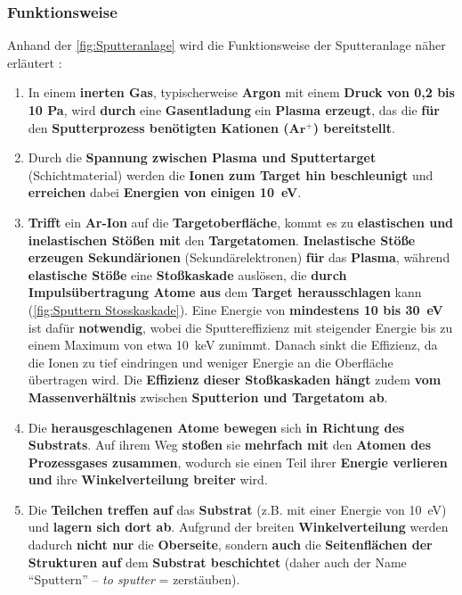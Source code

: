 \documentclass{article} %
\begin{document}
\vspace{1em}
\subsubsection{Funktionsweise} %
Anhand der \autoref{fig:Sputteranlage} wird die Funktionsweise der Sputteranlage näher erläutert \cite{keplinger2024}:

\begin{enumerate}
    \item In einem \textbf{inerten Gas}, typischerweise \textbf{Argon} mit einem \textbf{Druck von 0,2 bis 10 Pa}, wird \textbf{durch} eine 
    \textbf{Gasentladung} ein \textbf{Plasma erzeugt}, das die \textbf{für} den \textbf{Sputterprozess benötigten Kationen ($\mathbf{Ar^+}$) 
    bereitstellt}.
    \item Durch die \textbf{Spannung zwischen Plasma und Sputtertarget} (Schichtmaterial) werden die \textbf{Ionen zum Target hin beschleunigt} 
    und \textbf{erreichen} dabei \textbf{Energien von einigen 10~eV}.
    \item \textbf{Trifft} ein \textbf{Ar-Ion} auf die \textbf{Targetoberfläche}, kommt es zu \textbf{elastischen und inelastischen Stößen mit} 
    den \textbf{Targetatomen}. \textbf{Inelastische Stöße erzeugen Sekundärionen} (Sekundärelektronen) \textbf{für} das \textbf{Plasma}, während 
    \textbf{elastische Stöße} eine \textbf{Stoßkaskade} auslösen, die \textbf{durch Impulsübertragung Atome aus} dem \textbf{Target 
    herausschlagen} kann (\autoref{fig:Sputtern Stosskaskade}). Eine Energie von \textbf{mindestens 10 bis 30~eV} ist dafür \textbf{notwendig}, 
    wobei die Sputtereffizienz mit steigender Energie bis zu einem Maximum von etwa 10~keV zunimmt. Danach sinkt die Effizienz, da die Ionen zu 
    tief eindringen und weniger Energie an die Oberfläche übertragen wird. Die \textbf{Effizienz dieser Stoßkaskaden hängt} zudem 
    \textbf{vom Massenverhältnis} zwischen \textbf{Sputterion und Targetatom ab}.
    \item Die \textbf{herausgeschlagenen Atome bewegen} sich \textbf{in Richtung des Substrats}. Auf ihrem Weg \textbf{stoßen} sie 
    \textbf{mehrfach mit} den \textbf{Atomen des Prozessgases zusammen}, wodurch sie einen Teil ihrer \textbf{Energie verlieren und} ihre 
    \textbf{Winkelverteilung breiter} wird.
    \item Die \textbf{Teilchen treffen auf} das \textbf{Substrat} (z.B. mit einer Energie von 10~eV) und \textbf{lagern sich dort ab}. 
    Aufgrund der breiten \textbf{Winkelverteilung} werden dadurch \textbf{nicht nur} die \textbf{Oberseite}, sondern \textbf{auch} die 
    \textbf{Seitenflächen der Strukturen auf} dem \textbf{Substrat beschichtet} (daher auch der Name ``Sputtern'' -- \textit{to sputter} = 
    zerstäuben).
\end{enumerate}
\end{document}
